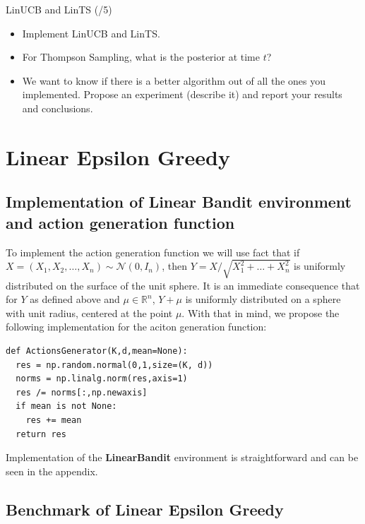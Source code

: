 \begin{problem}{LinUCB and LinTS (/5)}{}
\begin{itemize}
    \item Implement LinUCB and LinTS. 
    \item For Thompson Sampling, what is the posterior at time $t$?
    \item We want to know if there is a better algorithm out of all the ones you implemented. Propose an experiment (describe it) and report your results and conclusions.
\end{itemize}
\end{problem}

\section{Linear Epsilon Greedy}
\subsection{Implementation of Linear Bandit environment and action generation function}
To implement the action generation function we will use fact that if $ X = (X_1, X_2, \ldots, X_n) \sim \mathcal{N}(0, I_n) $, 
then $ Y = X / \sqrt{X_1^2 + \ldots + X_n^2} $ is uniformly distributed on the surface of the unit sphere. It is an immediate
consequence that for $Y$ as defined above and $\mu \in \mathbb{R}^n$, $ Y + \mu$ is uniformly distributed on a sphere with unit radius,
centered at the point $\mu$. With that in mind, we propose the following implementation for the aciton generation function:
\begin{verbatim}
def ActionsGenerator(K,d,mean=None):
  res = np.random.normal(0,1,size=(K, d))
  norms = np.linalg.norm(res,axis=1)
  res /= norms[:,np.newaxis]
  if mean is not None:
    res += mean
  return res
\end{verbatim}
Implementation of the \textbf{LinearBandit} environment is straightforward and can be seen in the appendix.
\subsection{Benchmark of Linear Epsilon Greedy}
